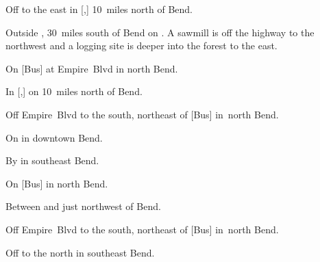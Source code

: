 

\begin{LocationList}

Off  to the east in [,] 10~miles north of Bend.

Outside , 30~miles south of Bend on .
A sawmill is off the highway to the northwest and a logging site is deeper into the forest to the east.

\Location{\GarageHQ \Garage}
On  [Bus] at Empire~Blvd in north Bend.

\Location{\GasStation \Gas \Rest}
In [,] on  10~miles north of Bend.

Off Empire~Blvd to the south, northeast of  [Bus] in~north Bend.

On  in downtown Bend.

By  in southeast Bend.

\Location{\RecruitmentAgency \Recruitment}
On  [Bus] in north Bend.

Between  and  just northwest of Bend.

Off Empire~Blvd to the south, northeast of  [Bus] in~north Bend.

Off  to the north in southeast Bend.

\end{LocationList}
